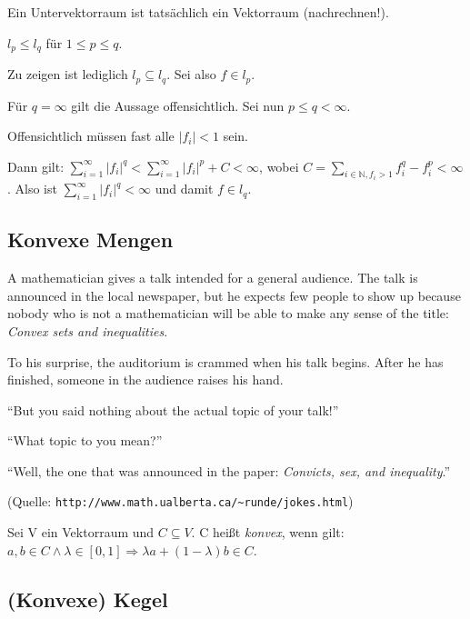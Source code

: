 \documentclass[10pt]{scrbook}
\begin{document}
\begin{Bem}
Ein Untervektorraum ist tatsächlich ein Vektorraum (nachrechnen!).
\end{Bem}

\begin{Sa}
$l_p\leq l_q$ für $1\leq p\leq q$.
\end{Sa}
\begin{bew}
Zu zeigen ist lediglich $l_p\subseteq l_q$. Sei also $f\in l_p$.

Für $q=\infty$ gilt die Aussage offensichtlich. Sei nun $p\leq q<\infty$.

Offensichtlich müssen fast alle $\left|f_i\right|<1$ sein. 

Dann gilt: $\sum\limits_{i=1}^\infty{\left|f_i\right|^q}<\sum\limits_{i=1}^\infty{\left|f_i\right|^p}+C<\infty$, wobei $C=\sum\limits_{i\in \mathbb{N}, f_i>1}{f_i^q-f_i^p}<\infty$. Also ist $\sum\limits_{i=1}^\infty{\left|f_i\right|^q}<\infty$ und damit $f\in l_q$.
\end{bew}

\subsection{Konvexe Mengen}

A mathematician gives a talk intended for a general audience. The talk is announced in the local newspaper, but he expects few people to show up because nobody who is not a mathematician will be able to make any sense of the title: \emph{Convex sets and inequalities}.

To his surprise, the auditorium is crammed when his talk begins. After he has finished, someone in the audience raises his hand.

"`But you said nothing about the actual topic of your talk!"'

"`What topic to you mean?"'

"`Well, the one that was announced in the paper: \emph{Convicts, sex, and inequality}."'

(Quelle: \verb|http://www.math.ualberta.ca/~runde/jokes.html|)

\begin{Def}
Sei V ein Vektorraum und $C\subseteq V$. C heißt \emph{konvex}, wenn gilt: $a, b\in C\wedge \lambda\in\left[0, 1\right]\Rightarrow \lambda a+(1-\lambda) b\in C$.
\end{Def}

\subsection{(Konvexe) Kegel}
\end{document}
